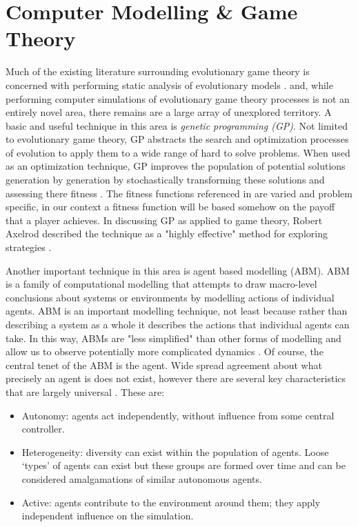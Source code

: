 \documentclass[11pt]{book}
\newcommand*{\np}{\par\noindent\newline}
\begin{document}
\section{Computer Modelling \& Game Theory}\label{agent}
Much of the existing literature surrounding evolutionary game theory is concerned with performing static analysis of
evolutionary models \citep{alger_homo_2013,hetzer_evolutionary_2013,newton_preferences_2017}. and, while performing
computer simulations of evolutionary game theory processes is not an entirely novel area, there remains are a large
array of unexplored territory. A basic and useful technique in this area is \textit{genetic programming (GP)}. Not
limited to evolutionary game theory, GP abstracts the search and optimization processes of evolution to apply them to a
wide range of hard to solve problems. When used as an optimization technique, GP improves the population of potential
solutions generation by generation by stochastically transforming these solutions and assessing there fitness
\citep{poli_field_2008}. The fitness functions referenced in \citet{poli_field_2008} are varied and problem specific, in
our context a fitness function will be based somehow on the payoff that a player achieves. In discussing GP as applied
to game theory, Robert Axelrod described the technique as a "highly effective" method for exploring strategies \cite[p.
~23]{axelrod_effective_1980}. 

\np Another important technique in this area is agent based modelling (ABM). ABM is a family of computational modelling
that attempts to draw macro-level conclusions about systems or environments by modelling actions of individual agents.
ABM is an important modelling technique, not least because rather than describing a system as a whole it describes the
actions that individual agents can take. In this way, ABMs are "less simplified" than other forms of modelling and allow
us to observe potentially more complicated dynamics \cite[p. ~25]{railsback_agent-based_2011}. Of course, the central
tenet of the ABM is the agent. Wide spread agreement about what precisely an agent is does not exist, however there are
several key characteristics that are largely universal \citep{heppenstall_introduction_2012}. These are: 
\begin{itemize}
	\item Autonomy: agents act independently, without influence from some central controller.
	\item Heterogeneity: diversity can exist within the population of agents. Loose `types' of agents can exist but
	these groups are formed over time and can be considered amalgamations of similar autonomous agents.
	\item Active: agents contribute to the environment around them; they apply independent influence on the simulation.
\end{itemize}
\citep{heppenstall_introduction_2012}
\end{document}
